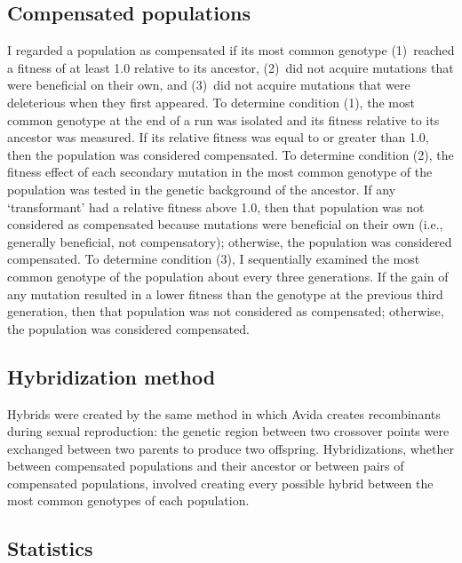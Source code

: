 \begin{doublespace}
\subsection{Compensated populations}

I regarded a population as compensated if its most common genotype
(1)~reached a fitness of at least 1.0 relative to its ancestor,
(2)~did not acquire mutations that were beneficial on their own, and
(3)~did not acquire mutations that were deleterious when they first appeared.
%
To determine condition (1), the most common genotype at the end of a run
was isolated and its fitness relative to its ancestor was measured.
%
If its relative fitness was equal to or greater than 1.0,
then the population was considered compensated.
%
To determine condition (2), the fitness effect of each
secondary mutation in the most common genotype of the population
was tested in the genetic background of the ancestor.
%
If any `transformant' had a relative fitness above 1.0,
then that population was not considered as compensated
because mutations were beneficial on their own
(i.e., generally beneficial, not compensatory);
otherwise, the population was considered compensated.
%
To determine condition (3), I sequentially examined the
most common genotype of the population about every three generations.
%
If the gain of any mutation resulted in a lower fitness than the
genotype at the previous third generation,
then that population was not considered as compensated;
otherwise, the population was considered compensated.



\subsection{Hybridization method}

Hybrids were created by the same method in which Avida
creates recombinants during sexual reproduction:
the genetic region between two crossover points
were exchanged between two parents to produce two offspring.
%
Hybridizations, whether between compensated populations
and their ancestor or between pairs of compensated populations,
involved creating every possible hybrid
between the most common genotypes of each population.



\subsection{Statistics}


\end{doublespace}
